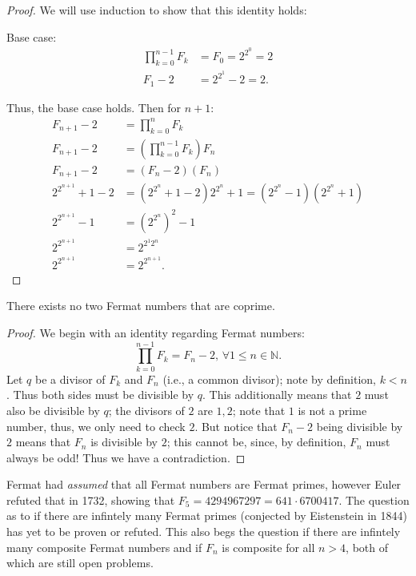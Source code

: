 \documentclass[12pt,oneside]{report}
\begin{document}
\begin{proof}
  We will use induction to show that this identity holds:

  Base case:
  \begin{align*}
    \prod_{k=0}^{n-1}F_k &= F_0=2^{2^0}=2 \\
    F_1-2 &= 2^{2^1}-2=2.
  \end{align*}

Thus, the base case holds. Then for \( n+1 \):
\begin{align*}
  F_{n+1}-2&=\prod_{k=0}^n F_k \\ 
  F_{n+1}-2&=\left( \prod_{k=0}^{n-1}F_k\right)F_n \\
  F_{n+1}-2&=(F_n-2)(F_n) \\ 
  2^{2^{n+1}}+1-2&=(2^{2^n}+1-2)2^{2^n}+1 = (2^{2^n}-1)(2^{2^n}+1) \\
  2^{2^{n+1}}-1&=(2^{2^n})^2-1 \\ 
  2^{2^{n+1}}&=2^{2^{1}2^n} \\ 
  2^{2^{n+1}}&=2^{2^{n+1}}. 
\end{align*}

\end{proof}

\begin{theorem}
  There exists no two Fermat numbers that are coprime.
\end{theorem}

\begin{proof}
  We begin with an identity regarding Fermat numbers:
  \[
    \prod_{k=0}^{n-1}F_k=F_n-2, \,  \forall 1\leq n\in \mathbb{N}
  .\] 
Let \( q \) be a divisor of \( F_k \) and \( F_n\) (i.e., a common divisor); note by definition, \( k<n \). Thus both sides must be divisible by \( q \). This additionally means that \( 2 \) must also be divisible by \( q \); the divisors of \( 2 \) are \( 1,2 \); note that \( 1 \) is not a prime number, thus, we only need to check \( 2 \). But notice that \( F_n-2 \) being divisible by \( 2 \) means that \( F_n \) is divisible by \( 2 \); this cannot be, since, by definition, \( F_n \) must always be odd! Thus we have a contradiction. 
\end{proof}


Fermat had \textit{assumed} that all Fermat numbers are Fermat primes, however Euler refuted that in 1732, showing that \( F_5=4294967297=641\cdot 6700417 \). The question as to if there are infintely many Fermat primes (conjected by Eistenstein in 1844) has yet to be proven or refuted. This also begs the question if there are infintely many composite Fermat numbers and if \( F_n \) is composite for all \( n>4 \), both of which are still open problems.
\end{document}
